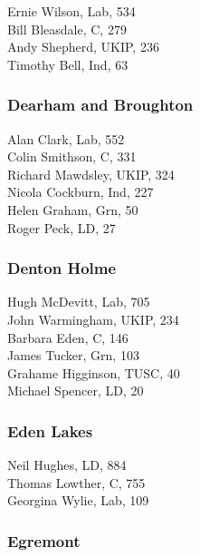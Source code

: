 \documentclass[a4paper,openany,10pt]{book}
\begin{document}


Ernie Wilson, Lab, 534\\
Bill Bleasdale, C, 279\\
Andy Shepherd, UKIP, 236\\
Timothy Bell, Ind, 63\\


\subsubsection*{Dearham and Broughton}



Alan Clark, Lab, 552\\
Colin Smithson, C, 331\\
Richard Mawdsley, UKIP, 324\\
Nicola Cockburn, Ind, 227\\
Helen Graham, Grn, 50\\
Roger Peck, LD, 27\\


\subsubsection*{Denton Holme}



Hugh McDevitt, Lab, 705\\
John Warmingham, UKIP, 234\\
Barbara Eden, C, 146\\
James Tucker, Grn, 103\\
Grahame Higginson, TUSC, 40\\
Michael Spencer, LD, 20\\


\subsubsection*{Eden Lakes}



Neil Hughes, LD, 884\\
Thomas Lowther, C, 755\\
Georgina Wylie, Lab, 109\\


\subsubsection*{Egremont}
\end{document}
